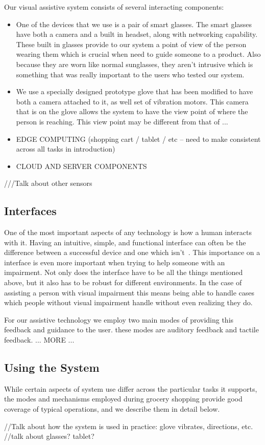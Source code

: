 Our visual assistive system consists of several interacting components: 
\begin{itemize}
\item One of the devices that we use is a pair of smart glasses. The smart
glasses have both a camera and a built in headset, along with
networking capability. These built in glasses provide to our system a
point of view of the person wearing them which is crucial when need to
guide someone to a product. Also because they are worn like normal
sunglasses, they aren't intrusive which is something that was really
important to the users who tested our system.

\item We use a specially designed prototype glove that has been
modified to have both a camera attached to it, as well set of
vibration motors. This camera that is on the glove allows the system
to have the view point of where the person is reaching. This view
point may be different from that of ...

\item EDGE COMPUTING (shopping cart / tablet / etc -- need to make consistent across all tasks in introduction)

\item CLOUD AND SERVER COMPONENTS

\end{itemize}

///Talk about other sensors


\subsection{Interfaces}
One of the most important aspects of any technology is how a human
interacts with it. Having an intuitive, simple, and functional
interface can often be the difference between a successful device and
one which isn't~\cite{iPhone}. This importance on a interface is even more important
when trying to help someone with an impairment. Not only does the
interface have to be all the things mentioned above, but it also has
to be robust for different environments. In the case of assisting a
person with visual impairment this means being able to handle cases
which people without visual impairment handle without even realizing
they do.

For our assistive technology we employ two main modes of providing
this feedback and guidance to the user. these modes are auditory
feedback and tactile feedback.  ... MORE ...

\subsection{Using the System}
While certain aspects of system use differ across the particular tasks
it supports, the modes and mechanisms employed during grocery shopping
provide good coverage of typical operations, and we describe them in
detail below.

//Talk about how the system is used in practice: glove vibrates, directions, etc.
//talk about glasses? tablet?
